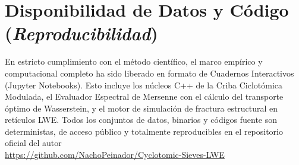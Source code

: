 \documentclass{article}
\numberwithin{equation}{section}
\theoremstyle{plain}
\theoremstyle{definition}
\begin{document}
\section*{Disponibilidad de Datos y Código (\textit{Reproducibilidad})}
En estricto cumplimiento con el método científico, el marco empírico y computacional completo ha sido liberado en formato de Cuadernos Interactivos (Jupyter Notebooks). Esto incluye los núcleos C++ de la Criba Ciclotómica Modulada, el Evaluador Espectral de Mersenne con el cálculo del transporte óptimo de Wasserstein, y el motor de simulación de fractura estructural en retículos LWE. Todos los conjuntos de datos, binarios y códigos fuente son deterministas, de acceso público y totalmente reproducibles en el repositorio oficial del autor \\
\url{https://github.com/NachoPeinador/Cyclotomic-Sieves-LWE}
\end{document}
